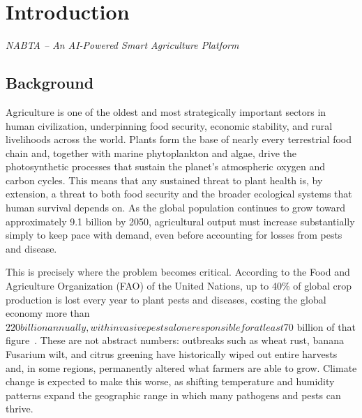 
\chapter{Introduction}
\label{chap:introduction}

\begin{center}
\textit{NABTA -- An AI-Powered Smart Agriculture Platform}
\end{center}

\section{Background}
\label{sec:intro_background}

Agriculture is one of the oldest and most strategically important sectors in human civilization, underpinning food security, economic stability, and rural livelihoods across the world. Plants form the base of nearly every terrestrial food chain and, together with marine phytoplankton and algae, drive the photosynthetic processes that sustain the planet's atmospheric oxygen and carbon cycles. This means that any sustained threat to plant health is, by extension, a threat to both food security and the broader ecological systems that human survival depends on. As the global population continues to grow toward approximately 9.1 billion by 2050, agricultural output must increase substantially simply to keep pace with demand, even before accounting for losses from pests and disease.

This is precisely where the problem becomes critical. According to the Food and Agriculture Organization (FAO) of the United Nations, up to 40\% of global crop production is lost every year to plant pests and diseases, costing the global economy more than $220 billion annually, with invasive pests alone responsible for at least $70 billion of that figure~\cite{fao_food_security}. These are not abstract numbers: outbreaks such as wheat rust, banana Fusarium wilt, and citrus greening have historically wiped out entire harvests and, in some regions, permanently altered what farmers are able to grow. Climate change is expected to make this worse, as shifting temperature and humidity patterns expand the geographic range in which many pathogens and pests can thrive.

